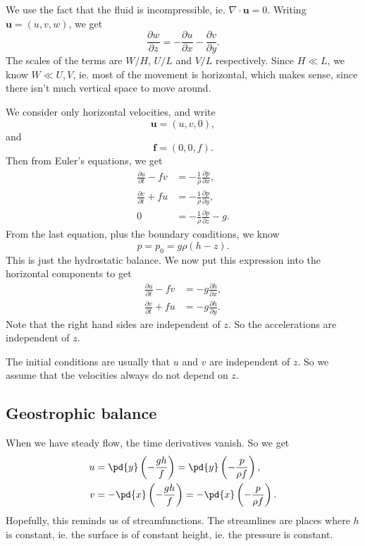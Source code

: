 \documentclass[a4paper]{article}
\begin{document}
We use the fact that the fluid is incompressible, ie. $\nabla \cdot \mathbf{u} = 0$. Writing $\mathbf{u} = (u, v, w)$, we get
\[
  \frac{\partial w}{\partial z} = -\frac{\partial u}{\partial x} - \frac{\partial v}{\partial y}.
\]
The scales of the terms are $W/H$, $U/L$ and $V/L$ respectively. Since $H \ll L$, we know $W \ll U, V$, ie. most of the movement is horizontal, which makes sense, since there isn't much vertical space to move around.

We consider only horizontal velocities, and write
\[
  \mathbf{u} = (u, v, 0),
\]
and
\[
  \mathbf{f} = (0, 0, f).
\]
Then from Euler's equations, we get
\begin{align*}
  \frac{\partial u}{\partial t} - fv &= -\frac{1}{\rho} \frac{\partial p}{\partial x},\\
  \frac{\partial v}{\partial t} + fu &= -\frac{1}{\rho} \frac{\partial p}{\partial y},\\
  0 &= -\frac{1}{\rho}\frac{\partial p}{\partial z} -g.
\end{align*}
From the last equation, plus the boundary conditions, we know
\[
  p = p_0 = g\rho(h - z).
\]
This is just the hydrostatic balance. We now put this expression into the horizontal components to get
\begin{align*}
  \frac{\partial u}{\partial t} - fv &= -g\frac{\partial h}{\partial x},\\
  \frac{\partial v}{\partial t} + fu &= -g\frac{\partial h}{\partial y}.
\end{align*}
Note that the right hand sides are independent of $z$. So the accelerations are independent of $z$.

The initial conditions are usually that $u$ and $v$ are independent of $z$. So we assume that the velocities always do not depend on $z$.

\subsection{Geostrophic balance}
When we have steady flow, the time derivatives vanish. So we get
\begin{align*}
  u &= \pd{y} \left(-\frac{gh}{f}\right) = \pd{y} \left(-\frac{p}{\rho f}\right),\\
  v &= -\pd{x} \left(-\frac{gh}{f}\right) = -\pd{x} \left(-\frac{p}{\rho f}\right).
\end{align*}
Hopefully, this reminds us of streamfunctions. The streamlines are places where $h$ is constant, ie. the surface is of constant height, ie. the pressure is constant.
\end{document}
